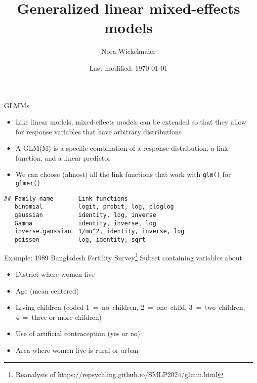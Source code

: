\documentclass[aspectratio=169]{beamer}
\title{Generalized linear mixed-effects models}
\author{Nora Wickelmaier}
\date{Last modified: \today}
\begin{document}
\begin{frame}{}
\thispagestyle{empty}
\titlepage
\end{frame}


\begin{frame}[fragile]{GLMMs}
  \begin{itemize}
    \item Like linear models, mixed-effects models can be extended so that they
      allow for response variables that have arbitrary distributions
    \item A GLM(M) is a specific combination of a response distribution, a link
      function, and a linear predictor 
    \item We can choose (almost) all the link functions that work with
      \texttt{glm()} for \texttt{glmer()}
  \end{itemize}
\begin{lstlisting}
## Family name       Link functions
   binomial          logit, probit, log, cloglog
   gaussian          identity, log, inverse
   Gamma             identity, inverse, log
   inverse.gaussian  1/mu^2, identity, inverse, log
   poisson           log, identity, sqrt
\end{lstlisting}
\end{frame}

\begin{frame}{Example: 1989 Bangladesh Fertility Survey\footnote{Reanalysis of https://repsychling.github.io/SMLP2024/glmm.html}}
Subset containing variables about
  \begin{itemize}
    \item District where women live
    \item Age (mean centered)
    \item Living children (coded 1~=~no~children, 2~=~one~child,
      3~=~two~children, 4~=~three or more children)
    \item Use of artificial contraception (yes or no)
    \item Area where women live is rural or urban
  \end{itemize}
\end{frame}
\end{document}
